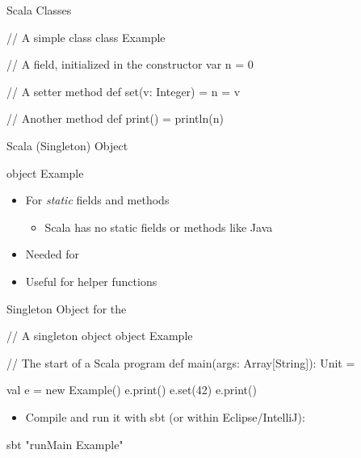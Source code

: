 \begin{frame}[fragile]{Scala Classes}
\begin{chisel}
// A simple class
class Example {
  // A field, initialized in the constructor
  var n = 0
  
  // A setter method
  def set(v: Integer) = {
    n = v
  }
  
  // Another method
  def print() = {
    println(n)
  }
}
\end{chisel}
\end{frame}

\begin{frame}[fragile]{Scala (Singleton) Object}
\begin{chisel}
object Example {}
\end{chisel}
\begin{itemize}
\item For \emph{static} fields and methods
\begin{itemize}
\item Scala has no static fields or methods like Java
\end{itemize}
\item Needed for 
\item Useful for helper functions
\end{itemize}
\end{frame}

\begin{frame}[fragile]{Singleton Object for the }
\begin{chisel}
// A singleton object
object Example {
  
  // The start of a Scala program
  def main(args: Array[String]): Unit = {
    
    val e = new Example()
    e.print()
    e.set(42)
    e.print()
  }
}
\end{chisel}
\begin{itemize}
\item Compile and run it with sbt (or within Eclipse/IntelliJ):
\end{itemize}
\begin{chisel}
sbt "runMain Example"
\end{chisel}
\end{frame}

